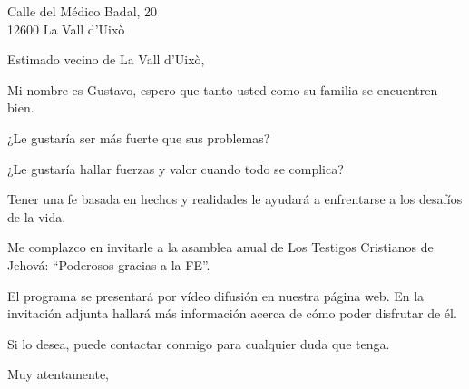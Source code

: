 \documentclass{scrlttr2}
\begin{document}
\begin{letter}{%
Calle del Médico Badal, 20\\
12600 La Vall d'Uixò\\
}
\opening{Estimado vecino de La Vall d'Uixò,}

Mi nombre es Gustavo, espero que tanto usted como su familia se encuentren bien.

¿Le gustaría ser más fuerte que sus problemas?

¿Le gustaría hallar fuerzas y valor cuando todo se complica?

Tener una fe basada en hechos y realidades le ayudará a enfrentarse a los desafíos de la vida.

Me complazco en invitarle a la asamblea anual de Los Testigos Cristianos de Jehová: ``Poderosos gracias a la FE''.

El programa se presentará por vídeo difusión en nuestra página web. En la invitación adjunta hallará más información acerca de cómo poder disfrutar de él.

Si lo desea, puede contactar conmigo para cualquier duda que tenga.

\closing{Muy atentamente,}


\end{letter}
\end{document}
